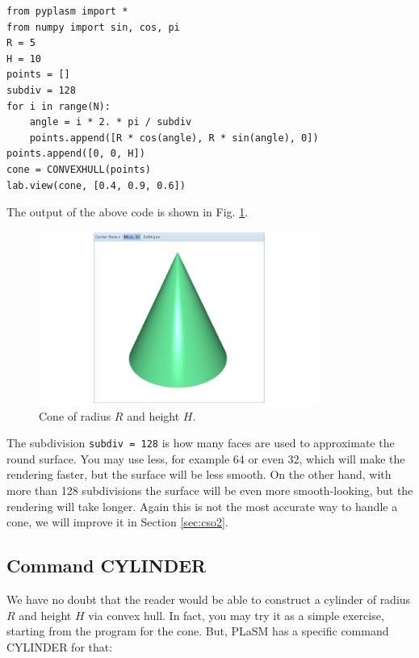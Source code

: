 \documentclass{article}
\begin{document}
{\small
\begin{verbatim}
from pyplasm import *
from numpy import sin, cos, pi
R = 5
H = 10
points = []
subdiv = 128
for i in range(N):
    angle = i * 2. * pi / subdiv
    points.append([R * cos(angle), R * sin(angle), 0])
points.append([0, 0, H])
cone = CONVEXHULL(points)
lab.view(cone, [0.4, 0.9, 0.6])
\end{verbatim}
}
\noindent
The output of the above code is shown in Fig. \ref{fig:convexhull-2}.

\begin{figure}[!ht]
\begin{center}
\includegraphics[width=0.82\textwidth]{img/convexhull-2.png}
\end{center}
\vspace{-2mm}
\caption{Cone of radius $R$ and height $H$.}
\label{fig:convexhull-2}
\end{figure}

The subdivision {\tt subdiv = 128} is how many
faces are used to approximate the round surface. You may use less, 
for example 64 or even 32, which will make the rendering faster, but
the surface will be less smooth. On the other hand, with more than 
128 subdivisions the surface will be even more smooth-looking, but 
the rendering will take longer. Again this is not the most accurate 
way to handle a cone, we will improve it in Section \ref{sec:cso2}.

\subsection{Command CYLINDER}

We have no doubt that the reader would be able to construct 
a cylinder of radius $R$ and height $H$ via convex hull. 
In fact, you may try it as a simple exercise, starting from 
the program for the cone. But, PLaSM has a specific command
CYLINDER for that:
\end{document}
